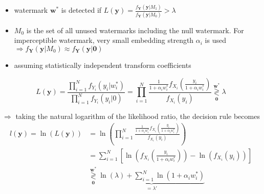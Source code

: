 \begin{frame}{\insertsection}

\begin{itemize}
	\item watermark $\bm w^*$ is detected if $L(\bm y) = \frac{f_{\bm Y}(\bm y|M_1)}{f_{\bm Y}(\bm y|M_0)} > \lambda$
	\item $M_0$ is the set of all unused watermarks including the null watermark. For imperceptible watermark, very small embedding strength $\alpha_i$ is used 
	\newline $\Rightarrow f_{\bm Y}(\bm y|M_0) \approx f_{\bm Y}(\bm y|\bm 0)$
	\item assuming statistically independent transform coefficients
\end{itemize}

\begin{equation*}
 L(\bm y) = \frac{\prod_{i=1}^N f_{Y_i}(y_i|w_i^*)}{\prod_{i=1}^N f_{Y_i}(y_i|0)} 
 = \prod_{i=1}^N \frac{\frac{1}{1+\alpha_i w^*_i}f_{X_i}\left(\frac{y_i}{1+\alpha_i w^*_i}\right)}{f_{X_i}(y_i)}   \underset{\bm 0}{\overset{\bm w^*}{\gtrless}}\lambda 
\end{equation*}

\end{frame}


\begin{frame}{\insertsection}
\textcolor{TUDblue}{$\Rightarrow$} taking the natural logarithm of the likelihood ratio, the decision rule becomes
\vspace{5mm}
\begin{align*}
 l(\bm y) = \ln(L(\bm y)) &= \ln \left( \prod_{i=1}^N \frac{\frac{1}{1+\alpha_i w^*_i}f_{X_i}\left(\frac{y_i}{1+\alpha_i w^*_i}\right)}{f_{X_i}(y_i)}\right) \\
&= \sum_{i=1}^{N} \left[ \ln\left(f_{X_i}\left(\frac{y_i}{1 + \alpha_i w^*_i}\right)\right)  - \ln\left(f_{X_i}(y_i)\right)  \right] \\
&\underset{\bm 0}{\overset{\bm w^*}{\gtrless}} \underbrace{\ln(\lambda) + \sum_{i=1}^N \ln (1 + \alpha_i w^*_i)}_{=\lambda'}  
\end{align*}
\end{frame}


